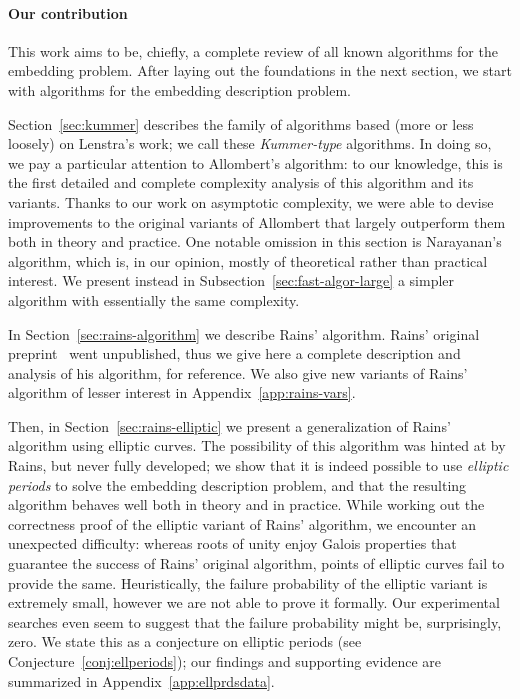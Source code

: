 \documentclass[12pt]{article}
\theoremstyle{plain}
\theoremstyle{definition}
\newcounter{algorithm}
\begin{document}
\paragraph{Our contribution}
This work aims to be, chiefly, a complete review of all known
algorithms for the embedding problem. %
After laying out the foundations in the next section, we start with
algorithms for the embedding description problem. %

Section~\ref{sec:kummer} describes the family of algorithms based
(more or less loosely) on Lenstra's work; we call these
\emph{Kummer-type} algorithms. %
In doing so, we pay a particular attention to Allombert's algorithm:
to our knowledge, this is the first detailed and complete complexity
analysis of this algorithm and its variants. %
Thanks to our work on asymptotic complexity, we were able to devise
improvements to the original variants of Allombert that largely
outperform them both in theory and practice. %
One notable omission in this section is Narayanan's algorithm, which
is, in our opinion, mostly of theoretical rather than practical
interest. %
We present instead in Subsection~\ref{sec:fast-algor-large} a simpler
algorithm with essentially the same complexity.

In Section~\ref{sec:rains-algorithm} we describe Rains' algorithm. %
Rains' original preprint~\cite{rains2008} went unpublished, thus we
give here a complete description and analysis of his algorithm, for
reference. %
We also give new variants of Rains' algorithm of lesser
interest in Appendix~\ref{app:rains-vars}.

Then, in Section~\ref{sec:rains-elliptic} we present a generalization
of Rains' algorithm using elliptic curves. %
The possibility of this algorithm was hinted at by Rains, but never
fully developed; we show that it is indeed possible to use
\emph{elliptic periods} to solve the embedding description problem,
and that the resulting algorithm behaves well both in theory and in
practice. %
While working out the correctness proof of the elliptic variant of
Rains' algorithm, we encounter an unexpected difficulty: whereas roots
of unity enjoy Galois properties that guarantee the success of Rains'
original algorithm, points of elliptic curves fail to provide the
same. %
Heuristically, the failure probability of the elliptic variant is
extremely small, however we are not able to prove it formally. %
Our experimental searches even seem to suggest that the failure
probability might be, surprisingly, zero. %
We state this as a conjecture on elliptic periods (see
Conjecture~\ref{conj:ellperiods}); our findings and supporting
evidence are summarized in Appendix~\ref{app:ellprdsdata}.
\end{document}
